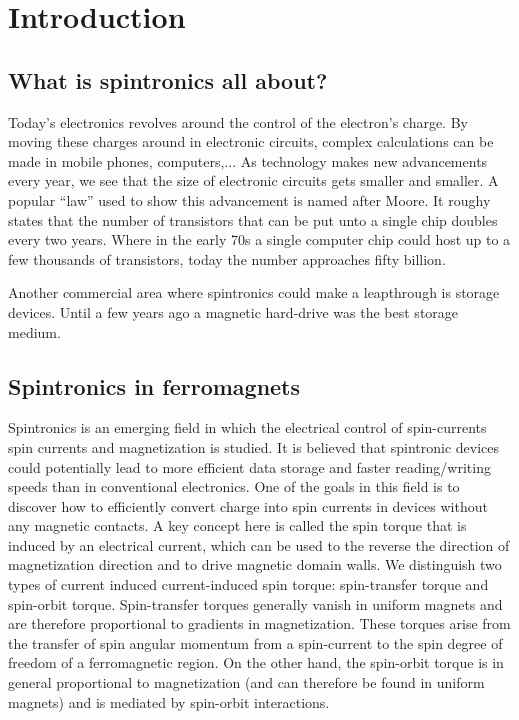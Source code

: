 \chapter{Introduction}\label{ch:introduction}
\section{What is spintronics all about?}
Today's electronics revolves around the control of the electron's charge. By moving these charges around in electronic circuits, complex calculations can be made in mobile phones, computers,... As technology makes new advancements every year, we see that the size of electronic circuits gets smaller and smaller. A popular ``law'' used to show this advancement is named after Moore. It roughy states that the number of transistors that can be put unto a single chip doubles every two years. Where in the early 70s a single computer chip could host up to a few thousands of transistors, today the number approaches fifty billion.  

Another commercial area where spintronics could make a leapthrough is storage devices. Until a few years ago a magnetic hard-drive was the best storage medium. 

\section{Spintronics in ferromagnets}
Spintronics is an emerging field in which the electrical control of spin-currents spin currents
and magnetization is studied. It is believed that spintronic devices could potentially lead to
more efficient data storage and faster reading/writing speeds than in conventional electronics. One
of the goals in this field is to discover how to efficiently convert charge into spin
currents in devices without any magnetic contacts. A key concept here is called the spin torque that is induced by an electrical current, which can be used to the reverse the direction of magnetization direction and
to drive magnetic domain walls. We distinguish two types of current induced current-induced spin
torque: spin-transfer torque and spin-orbit torque. Spin-transfer torques generally vanish in
uniform magnets and are therefore proportional to gradients in magnetization. These torques arise
from the transfer of spin angular momentum from a spin-current to the spin degree of
freedom of a ferromagnetic region. 
On the other hand, the spin-orbit torque is in general proportional to
magnetization (and can therefore be found in uniform magnets) and is mediated by spin-orbit interactions.

